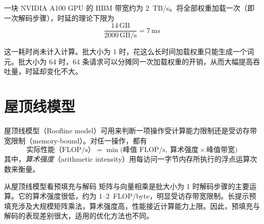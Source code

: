 一块 NVIDIA A100 GPU 的 HBM 带宽约为 2~TB/s。将全部权重加载一次（即一次解码步骤），时延的理论下限为
\[
\frac{14\,\mathrm{GB}}{2000\,\mathrm{GB/s}}=7\,\mathrm{ms}
\]

这一耗时尚未计入计算。批大小为 1 时，花这么长时间加载权重只能生成一个词元。批大小为 64 时，64 条请求可以分摊同一次加载权重的开销，从而大幅提高吞吐量，时延却变化不大。

\section{屋顶线模型}

屋顶线模型（Roofline model）可用来判断一项操作受计算能力限制还是受访存带宽限制（memory-bound）。对任一操作，都有
\[
\text{实际性能（FLOP/s）}
=\min\bigl(\text{峰值 FLOP/s},\ \text{算术强度}\times\text{峰值带宽}\bigr)
\]
\nopagebreak[3]
其中，\emph{算术强度}（arithmetic intensity）用每访问一字节内存所执行的浮点运算次数来衡量。

\begin{conceptbox}{从屋顶线模型看预填充与解码}
矩阵与向量相乘是批大小为 1 时解码步骤的主要运算。它的算术强度很低，约为 1–2~FLOP/byte，明显受访存带宽限制。长提示预填充涉及大规模矩阵乘法，算术强度高，性能接近计算能力上限。因此，预填充与解码的表现差别很大，适用的优化方法也不同。
\end{conceptbox}

